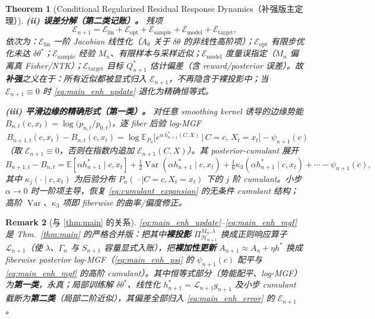 \documentclass[11pt,a4paper]{article}
\newtheorem{theorem}{Theorem}[section]
\newtheorem{remark}[theorem]{Remark}
\DeclareMathOperator{\Var}{Var}
\newcommand{\E}{\mathbb{E}}
\newcommand{\cL}{\mathcal{L}}
\newcommand{\cH}{\mathcal{H}}
\newcommand{\cE}{\mathcal{E}}
\newcommand{\ProjectOp}{\Pi}
\begin{document}
\begin{theorem}[Conditional Regularized Residual Response Dynamics（补强版主定理）]
\medskip
\noindent\textbf{(ii) 误差分解（第二类记账）。} 残项
\begin{equation}\label{eq:main_enh_error}
\cE_{n+1}=\cE_{\mathrm{lin}}+\cE_{\mathrm{opt}}+\cE_{\mathrm{sample}}+\cE_{\mathrm{model}}+\cE_{\mathrm{target}},
\end{equation}
依次为：$\cE_{\mathrm{lin}}$ 一阶 Jacobian 线性化（$A_\theta$ 关于 $\delta\theta$ 的非线性高阶项）；$\cE_{\mathrm{opt}}$ 有限步优化未达 $\delta\theta^*$；$\cE_{\mathrm{sample}}$ 经验 $M_n$、有限样本与采样近似；$\cE_{\mathrm{model}}$ 度量误指定（$M_n$ 偏离真 Fisher/NTK）；$\cE_{\mathrm{target}}$ 目标 $Q^*_{n+1}$ 估计偏差（含 reward/posterior 误差）。故\textbf{补强}之义在于：所有近似都被显式归入 $\cE_{n+1}$，不再隐含于裸投影中；当 $\cE_{n+1}\equiv0$ 时 \eqref{eq:main_enh_update} 退化为精确恒等式。

\medskip
\noindent\textbf{(iii) 平滑边缘的精确形式（第一类）。} 对任意 smoothing kernel 诱导的边缘势能 $B_{n,t}(c,x_t)=\log\bigl(p_{n,t}/p_{0,t}\bigr)$，逐 fiber 后验 log-MGF
\begin{equation}\label{eq:main_enh_mgf}
\boxed{\,B_{n+1,t}(c,x_t)-B_{n,t}(c,x_t)=\log\E_{P_n}\!\bigl[e^{\alpha\,h^*_{n+1}(C,X)}\,\big|\,C=c,\,X_t=x_t\bigr]-\psi_{n+1}(c)\,}
\end{equation}
（取 $\cE_{n+1}\equiv0$，否则在指数内追加 $\cE_{n+1}(C,X)$）。其 posterior-cumulant 展开
\begin{equation*}
B_{n+1,t}-B_{n,t}=\E[\alpha h^*_{n+1}\mid c,x_t]+\tfrac12\Var(\alpha h^*_{n+1}\mid c,x_t)+\tfrac16\kappa_3(\alpha h^*_{n+1}\mid c,x_t)+\cdots-\psi_{n+1}(c),
\end{equation*}
其中 $\kappa_j(\cdot\mid c,x_t)$ 为后验分布 $P_n(\,\cdot\mid C=c,X_t=x_t)$ 下的 $j$ 阶 cumulant。小步 $\alpha\to0$ 时一阶项主导，恢复 \eqref{eq:cumulant_expansion} 的无条件 cumulant 结构；高阶 $\Var$、$\kappa_3$ 项即 fiberwise 的曲率/偏度修正。

\end{theorem}

\begin{remark}[与 \ref{thm:main} 的关系]
\eqref{eq:main_enh_update}--\eqref{eq:main_enh_mgf} 是 Thm.~\ref{thm:main} 的严格合并版：把其中\textbf{裸投影} $\ProjectOp^{M_n,\lambda}_{\cH_{n+1}}$ 换成正则响应算子 $\cL_{n+1}$（使 $\lambda$、$\Gamma_n$ 与 $S_{n+1}$ 容量显式入账），把\textbf{裸加性更新} $A_{n+1}\approx A_n+\eta h^*$ 换成 fiberwise posterior log-MGF（\eqref{eq:main_enh_psi} 的 $\psi_{n+1}(c)$ 配平与 \eqref{eq:main_enh_mgf} 的高阶 cumulant）。其中恒等式部分（势能配平、log-MGF）为\textbf{第一类}，永真；局部训练解 $\delta\theta^*$、线性化 $h^*_{n+1}=\cL_{n+1}g_{n+1}$ 及小步 cumulant 截断为\textbf{第二类}（局部二阶近似），其偏差全部归入 \eqref{eq:main_enh_error} 的 $\cE_{n+1}$。
\end{remark}
\end{document}
